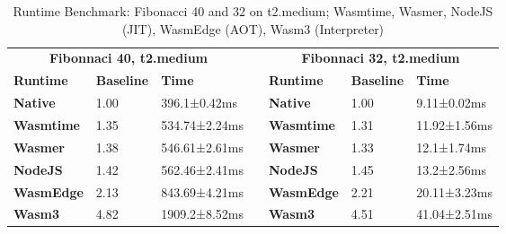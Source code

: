 \begin{table}[]
    \begin{tabular}{|lll|l|lll|}
    \cline{1-3} \cline{5-7}
    \multicolumn{3}{|c|}{\textbf{Fibonnaci 40, t2.medium}}                                           & \multirow{8}{*}{} & \multicolumn{3}{c|}{\textbf{Fibonnaci 32, t2.medium}}                                           \\ \cline{1-3} \cline{5-7} 
    \multicolumn{1}{|l|}{\textbf{Runtime}}  & \multicolumn{1}{l|}{\textbf{Baseline}} & \textbf{Time} &                   & \multicolumn{1}{l|}{\textbf{Runtime}}  & \multicolumn{1}{l|}{\textbf{Baseline}} & \textbf{Time} \\ \cline{1-3} \cline{5-7} 
    \multicolumn{1}{|l|}{\textbf{Native}}   & \multicolumn{1}{l|}{1.00}              & 396.1±0.42ms  &                   & \multicolumn{1}{l|}{\textbf{Native}}   & \multicolumn{1}{l|}{1.00}              & 9.11±0.02ms   \\ \cline{1-3} \cline{5-7} 
    \multicolumn{1}{|l|}{\textbf{Wasmtime}} & \multicolumn{1}{l|}{1.35}              & 534.74±2.24ms &                   & \multicolumn{1}{l|}{\textbf{Wasmtime}} & \multicolumn{1}{l|}{1.31}              & 11.92±1.56ms  \\ \cline{1-3} \cline{5-7} 
    \multicolumn{1}{|l|}{\textbf{Wasmer}}   & \multicolumn{1}{l|}{1.38}              & 546.61±2.61ms &                   & \multicolumn{1}{l|}{\textbf{Wasmer}}   & \multicolumn{1}{l|}{1.33}              & 12.1±1.74ms   \\ \cline{1-3} \cline{5-7} 
    \multicolumn{1}{|l|}{\textbf{NodeJS}}   & \multicolumn{1}{l|}{1.42}              & 562.46±2.41ms &                   & \multicolumn{1}{l|}{\textbf{NodeJS}}   & \multicolumn{1}{l|}{1.45}              & 13.2±2.56ms   \\ \cline{1-3} \cline{5-7} 
    \multicolumn{1}{|l|}{\textbf{WasmEdge}} & \multicolumn{1}{l|}{2.13}              & 843.69±4.21ms &                   & \multicolumn{1}{l|}{\textbf{WasmEdge}} & \multicolumn{1}{l|}{2.21}              & 20.11±3.23ms  \\ \cline{1-3} \cline{5-7} 
    \multicolumn{1}{|l|}{\textbf{Wasm3}}    & \multicolumn{1}{l|}{4.82}              & 1909.2±8.52ms &                   & \multicolumn{1}{l|}{\textbf{Wasm3}}    & \multicolumn{1}{l|}{4.51}              & 41.04±2.51ms  \\ \cline{1-3} \cline{5-7} 
    \end{tabular}
    \caption{Runtime Benchmark: Fibonacci 40 and 32 on t2.medium; Wasmtime, Wasmer, NodeJS (JIT), WasmEdge (AOT), Wasm3 (Interpreter)}
    \label{tab:t2-medium-fibonacci}
\end{table}



